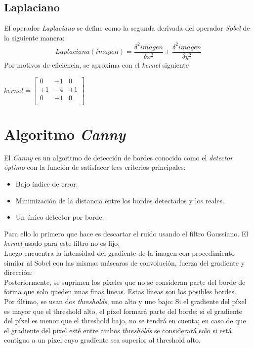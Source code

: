 \subsection{Laplaciano}
El operador \emph{Laplaciano} se define como la segunda derivada del
operador \emph{Sobel} de la siguiente manera:
\begin{equation*}
  Laplaciana(imagen) = \frac{\delta^{2} imagen}{\delta x^{2}} + \frac{\delta^{2} imagen}{\delta y^{2}}
\end{equation*}
Por motivos de eficiencia, se aproxima con el \emph{kernel} siguiente
\begin{center}
  $ kernel = \begin{bmatrix}
    0 & +1 & 0 \\
    +1 & -4 & +1 \\
    0 & +1 & 0 \\
  \end{bmatrix}
  $
\end{center}

\section{Algoritmo \emph{Canny}}\label{tecnica:canny}
El \emph{Canny} es un algoritmo de detección de bordes conocido como
el \emph{detector óptimo} con la función de satisfacer tres criterios
principales:
\begin{itemize}
\item Bajo índice de error.
\item Minimización de la distancia entre los bordes detectados y los
  reales.
\item Un único detector por borde.
\end{itemize}
Para ello lo primero que hace es descartar el ruido usando el filtro
Gaussiano.
El \emph{kernel} usado para este filtro no es fijo.\\
Luego encuentra la intensidad del gradiente de la imagen con
procedimiento similar al Sobel con las mismas máscaras de convolución,
fuerza del gradiente y dirección:\\
Posteriormente, se suprimen los píxeles que no se consideran parte del
borde de forma que solo queden unas finas líneas. Estas líneas son los posibles bordes.\\
Por último, se usan dos \emph{thresholds}, uno alto y uno bajo: Si el
gradiente del píxel es mayor que el threshold alto, el píxel formará
parte del borde; si el gradiente del píxel es menor que el threshold
bajo, no se tendrá en cuenta; en caso de que el gradiente del píxel
esté entre ambos \emph{thresholds} se considerará solo si está
contiguo a un píxel cuyo gradiente sea superior al threshold alto.

